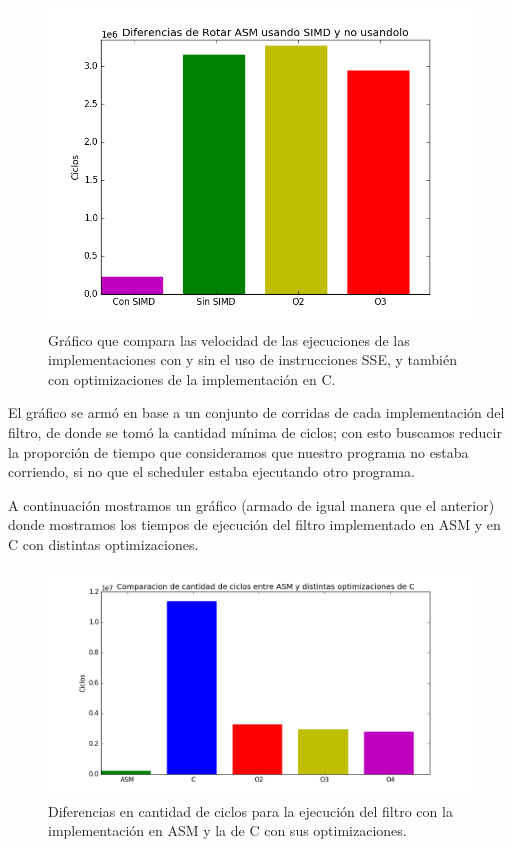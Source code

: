 \begin{figure}[h!]
\centering
\captionsetup{justification=centering}
	\includegraphics[width = 15 cm, height = 8 cm]{imagenes/SinSIMD.png}
\caption[center]{Gráfico que compara las velocidad de las ejecuciones de las implementaciones con y sin el uso de instrucciones SSE, y también con optimizaciones de la implementación en C.}
\end{figure}

	El gráfico se armó en base a un conjunto de corridas de cada implementación del filtro, de donde se tomó la cantidad mínima de ciclos; con esto buscamos reducir la proporción de tiempo que consideramos que nuestro programa no estaba corriendo, si no que el scheduler estaba ejecutando otro programa.
	
	A continuación mostramos un gráfico (armado de igual manera que el anterior) donde mostramos los tiempos de ejecución del filtro implementado en ASM y en C con distintas optimizaciones.
	
\begin{figure}[h!]
\centering
\captionsetup{justification=centering}
\includegraphics[width = 15 cm, height = 8 cm]{imagenes/rotarConC.png}
\caption[center]{Diferencias en cantidad de ciclos para la ejecución del filtro con la implementación en ASM y la de C con sus optimizaciones.}
\end{figure}